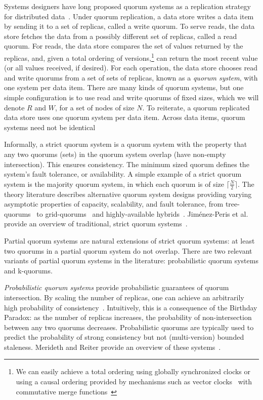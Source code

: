 \documentclass{vldb}
\begin{document}
Systems designers have long proposed quorum systems as a replication
strategy for distributed data~\cite{quorums-start}.  Under quorum
replication, a data store writes a data item by sending it to a set of
replicas, called a write quorum.  To serve reads, the data store
fetches the data from a possibly different set of replicas, called a
read quorum.  For reads, the data store compares the set of values
returned by the replicas, and, given a total ordering of
versions,\footnote{We can easily achieve a total ordering using
  globally synchronized clocks or using a causal ordering provided by
  mechanisms such as vector clocks~\cite{vectorclock} with commutative
  merge functions~\cite{cops}} can return the most recent value (or
all values received, if desired).  For each operation, the data store
chooses read and write quorums from a set of sets of replicas, known
as a \textit{quorum system}, with one system per data item.  There are
many kinds of quorum systems, but one simple configuration is to use
read and write quorums of fixed sizes, which we will denote $R$ and
$W$, for a set of nodes of size $N$.  To reiterate, a quorum
replicated data store uses one quorum system per data item.  Across
data items, quorum systems need not be identical

Informally, a strict quorum system is a quorum system with the
property that any two quorums (sets) in the quorum system overlap
(have non-empty intersection). This ensures consistency.  The minimum
sized quorum defines the system's fault tolerance, or availability.  A
simple example of a strict quorum system is the majority quorum
system, in which each quorum is of size $\lceil \frac{N}{2}\rceil$.
The theory literature describes alternative quorum system designs
providing varying asymptotic properties of capacity, scalability, and
fault tolerance, from tree-quorums~\cite{treequorum} to
grid-quorums~\cite{quorumsystems} and highly-available
hybrids~\cite{92-quorums}.  Jim\'{e}nez-Peris et al. provide an
overview of traditional, strict quorum
systems~\cite{quorums-alternative}.

Partial quorum systems are natural extensions of strict quorum
systems: at least two quorums in a partial quorum system do not
overlap.  There are two relevant variants of partial quorum systems in
the literature: probabilistic quorum systems and k-quorums.

\textit{Probabilistic quorum systems} provide probabilistic guarantees
of quorum intersection.  By scaling the number of replicas, one can
achieve an arbitrarily high probability of
consistency~\cite{prob-quorum}.  Intuitively, this is a consequence of
the Birthday Paradox: as the number of replicas increases, the
probability of non-intersection between any two quorums decreases.
Probabilistic quorums are typically used to predict the probability of
strong consistency but not (multi-version) bounded staleness.
Merideth and Reiter provide an overview of these
systems~\cite{quorum-overview}.
\end{document}
